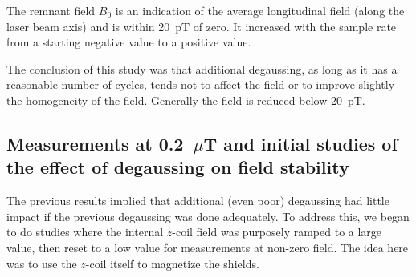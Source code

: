 The remnant field $B_0$ is an indication of the average longitudinal
field (along the laser beam axis) and is within 20~pT of zero.  It
increased with the sample rate from a starting negative value to a
positive value.

The conclusion of this study was that additional degaussing, as long
as it has a reasonable number of cycles, tends not to affect the field
or to improve slightly the homogeneity of the field.  Generally the
field is reduced below 20~pT.



\subsection{Measurements at 0.2~$\mu$T and initial studies of the effect of degaussing on field stability\label{sec:three-degauss}}

The previous results implied that additional (even poor) degaussing
had little impact if the previous degaussing was done adequately.  To
address this, we began to do studies where the internal $z$-coil field
was purposely ramped to a large value, then reset to a low value for
measurements at non-zero field.  The idea here was to use the $z$-coil
itself to magnetize the shields.


